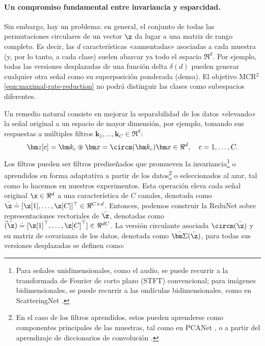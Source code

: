 \documentclass[../../book-main.tex]{subfiles}
\begin{document}
\paragraph{Un compromiso fundamental entre invariancia y esparcidad.}
Sin embargo, hay un problema: en general, el conjunto de todas las
permutaciones circulares de un vector $\z$ da lugar a una matriz de rango completo. Es decir, las
$d$ características «aumentadas» asociadas a cada muestra (y, por lo tanto, a cada
clase) suelen abarcar ya todo el espacio $\Re^d$. Por ejemplo,
todas las versiones desplazadas de una función delta $\delta(d)$ pueden generar cualquier
otra señal como su superposición ponderada (densa). El objetivo MCR$^2$
\eqref{eqn:maximal-rate-reduction} no podrá
distinguir las clases como subespacios diferentes.

Un remedio natural consiste en mejorar la separabilidad de los datos «elevando»
la señal original a un espacio de mayor dimensión, por ejemplo,
tomando sus respuestas a múltiples filtros $\bm k_1, \ldots, \bm
k_C \in \Re^d$:
\begin{equation}
    \bm z[c] = \bm k_c \circledast \bm x  =  \circm(\bm k_c) \bm x
    \in \Re^d, \quad c = 1, \ldots, C.
    \label{eqn:lift-1d}
\end{equation}
Los filtros pueden ser filtros prediseñados que promueven la 
invariancia\footnote{Para señales unidimensionales, como el audio, se puede recurrir a la
    transformada de Fourier de corto plazo (STFT) convencional; para imágenes bidimensionales, se
    puede recurrir a las ondículas bidimensionales, como en ScatteringNet
\cite{scattering-net}.} o aprendidos en forma adaptativa a partir de los
datos\footnote{En el caso de los filtros aprendidos, estos pueden aprenderse como
    componentes principales de las muestras, tal como en PCANet
    \cite{chan2015pcanet}, o a partir del aprendizaje de diccionarios de convolución
\cite{li2019multichannel,qu2019nonconvex}.} o seleccionados al azar, tal como
lo hacemos en nuestros experimentos. Esta operación eleva cada señal original
$\x \in \Re^d$ a una característica de $C$ canales, denotada como $\bar{\z}  \doteq
[\z[1], \ldots, \z[C]]^\top \in \Re^{C\times d}$.
Entonces, podemos construir la ReduNet sobre representaciones vectoriales de
$\bar{\z}$, denotadas como
$\vec(\bar\z) \doteq [\z[1]^\top, \ldots, \z[C]^\top] \in \Re^{dC}$.
La versión circulante asociada $ \circm(\bar{\z})$ y su 
matriz de covarianza de los datos, denotada como $\bar{\bm \Sigma}(\bar\z)$, para todas sus
versiones desplazadas se definen como:
\end{document}
